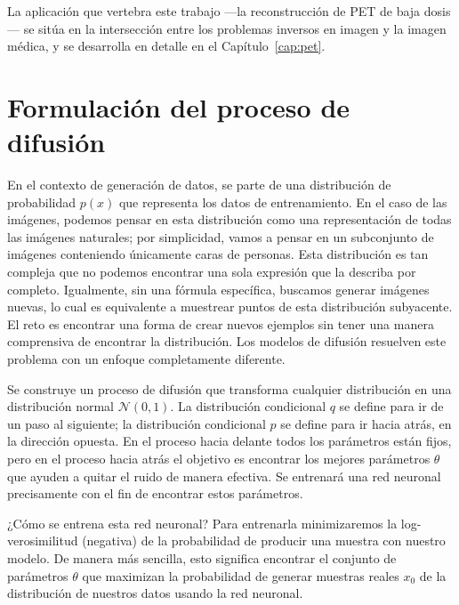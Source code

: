 La aplicación que vertebra este trabajo —la reconstrucción de PET de
baja dosis— se sitúa en la intersección entre los problemas inversos
en imagen y la imagen médica, y se desarrolla en detalle en el
Capítulo~\ref{cap:pet}.


\section{Formulación del proceso de difusión}
\label{sec:formulacion-difusion}

En el contexto de generación de datos, se parte de una distribución
de probabilidad $p(x)$ que representa los datos de entrenamiento.
En el caso de las imágenes, podemos pensar en esta distribución
como una representación de todas las imágenes naturales; por
simplicidad, vamos a pensar en un subconjunto de imágenes
conteniendo únicamente caras de personas. Esta distribución es
tan compleja que no podemos encontrar una sola expresión que la
describa por completo. Igualmente, sin una fórmula específica,
buscamos generar imágenes nuevas, lo cual es equivalente a
muestrear puntos de esta distribución subyacente. El reto es
encontrar una forma de crear nuevos ejemplos sin tener una manera
comprensiva de encontrar la distribución. Los modelos de difusión
resuelven este problema con un enfoque completamente diferente.

Se construye un proceso de difusión que transforma cualquier
distribución en una distribución normal $\mathcal{N}(0,1)$. La
distribución condicional $q$ se define para ir de un paso al
siguiente; la distribución condicional $p$ se define para ir hacia
atrás, en la dirección opuesta. En el proceso hacia delante todos
los parámetros están fijos, pero en el proceso hacia atrás el
objetivo es encontrar los mejores parámetros $\theta$ que ayuden
a quitar el ruido de manera efectiva. Se entrenará una red neuronal
precisamente con el fin de encontrar estos parámetros.

¿Cómo se entrena esta red neuronal? Para entrenarla minimizaremos
la log-verosimilitud (negativa) de la probabilidad de producir una
muestra con nuestro modelo. De manera más sencilla, esto significa
encontrar el conjunto de parámetros $\theta$ que maximizan la
probabilidad de generar muestras reales $x_0$ de la distribución
de nuestros datos usando la red neuronal.

